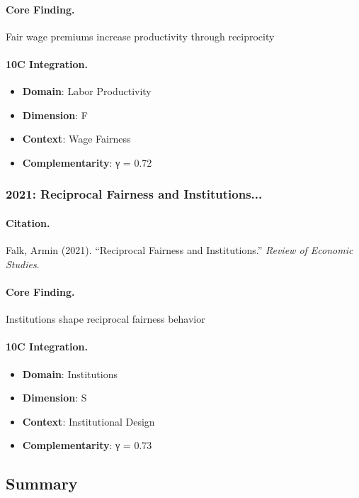 \paragraph{Core Finding.}
Fair wage premiums increase productivity through reciprocity

\paragraph{10C Integration.}
\begin{itemize}[nosep]
  \item \textbf{Domain}: Labor Productivity
  \item \textbf{Dimension}: F
  \item \textbf{Context}: Wage Fairness
  \item \textbf{Complementarity}: γ = 0.72
\end{itemize}


\subsubsection{2021: Reciprocal Fairness and Institutions...}

\paragraph{Citation.}
Falk, Armin (2021). ``Reciprocal Fairness and Institutions.''
\textit{Review of Economic Studies}.

\paragraph{Core Finding.}
Institutions shape reciprocal fairness behavior

\paragraph{10C Integration.}
\begin{itemize}[nosep]
  \item \textbf{Domain}: Institutions
  \item \textbf{Dimension}: S
  \item \textbf{Context}: Institutional Design
  \item \textbf{Complementarity}: γ = 0.73
\end{itemize}


\subsection{Summary}

